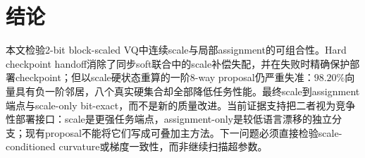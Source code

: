 \section{结论}
本文检验2-bit block-scaled VQ中连续scale与局部assignment的可组合性。Hard checkpoint handoff消除了同步soft联合中的scale补偿失配，并在失败时精确保护部署checkpoint；但以scale硬状态重算的一阶8-way proposal仍严重失准：$98.20\%$向量具有负一阶邻居，八个真实硬集合却全部降低任务性能。最终scale到assignment端点与scale-only bit-exact，而不是新的质量改进。当前证据支持把二者视为竞争性部署接口：scale是更强任务端点，assignment-only是较低语言漂移的独立分支；现有proposal不能将它们写成可叠加主方法。下一问题必须直接检验scale-conditioned curvature或梯度一致性，而非继续扫描超参数。
